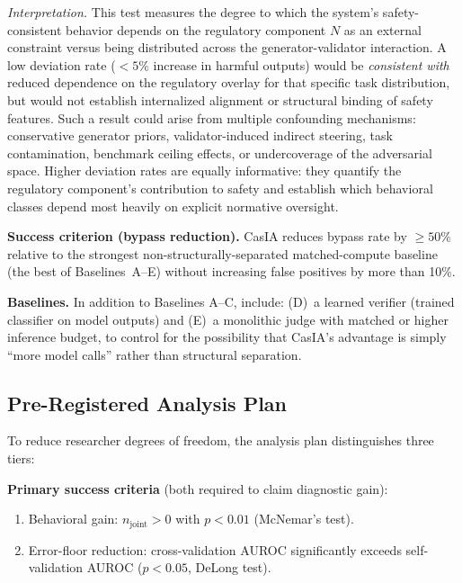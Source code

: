\documentclass[11pt,a4paper]{article}
\theoremstyle{definition}
\begin{document}
\emph{Interpretation.} This test measures the degree to which the system's safety-consistent behavior depends on the regulatory component $N$ as an external constraint versus being distributed across the generator-validator interaction. A low deviation rate ($<5\%$ increase in harmful outputs) would be \emph{consistent with} reduced dependence on the regulatory overlay for that specific task distribution, but would not establish internalized alignment or structural binding of safety features. Such a result could arise from multiple confounding mechanisms: conservative generator priors, validator-induced indirect steering, task contamination, benchmark ceiling effects, or undercoverage of the adversarial space. Higher deviation rates are equally informative: they quantify the regulatory component's contribution to safety and establish which behavioral classes depend most heavily on explicit normative oversight.

\textbf{Success criterion (bypass reduction).} CasIA reduces bypass rate by $\geq 50\%$ relative to the strongest non-structurally-separated matched-compute baseline (the best of Baselines~A--E) without increasing false positives by more than 10\%.

\textbf{Baselines.} In addition to Baselines A--C, include: (D)~a learned verifier (trained classifier on model outputs) and (E)~a monolithic judge with matched or higher inference budget, to control for the possibility that CasIA's advantage is simply ``more model calls'' rather than structural separation.


\subsection{Pre-Registered Analysis Plan}
\label{subsec:falsification}

To reduce researcher degrees of freedom, the analysis plan distinguishes three tiers:

\textbf{Primary success criteria} (both required to claim diagnostic gain):
\begin{enumerate}[leftmargin=*,itemsep=2pt]
\item Behavioral gain: $n_\text{joint} > 0$ with $p < 0.01$ (McNemar's test).
\item Error-floor reduction: cross-validation AUROC significantly exceeds self-validation AUROC ($p < 0.05$, DeLong test).
\end{enumerate}
\end{document}

